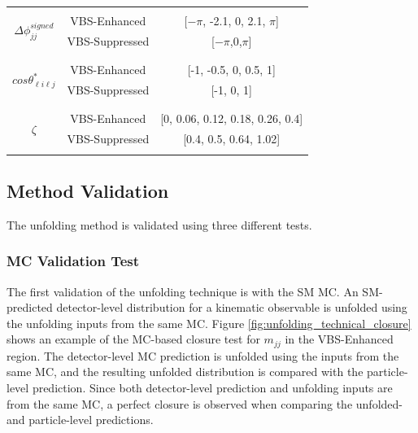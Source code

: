 \begin{table}[!htbp]
\begin{center}
\begin{tabular}{ | c | c | c | }
    & &\\
    \hline
    \multirow{4}{*}{ $\Delta \phi_{jj}^{signed}$ } &  &  \\
    & VBS-Enhanced & [$-\pi$, -2.1, 0, 2.1, $\pi$] \\
    & VBS-Suppressed & [$-\pi$,0,$\pi$] \\
    & & \\
    \hline
    \multirow{4}{*}{ $cos \theta_{\ell i\ell j}^{\ast}$ } &  &  \\
    & VBS-Enhanced & [-1, -0.5, 0, 0.5, 1] \\
    & VBS-Suppressed & [-1, 0, 1]\\
    & & \\
    \hline
    \multirow{4}{*}{ $\zeta$ } &  &  \\
    & VBS-Enhanced &[0, 0.06, 0.12, 0.18, 0.26, 0.4] \\
    & VBS-Suppressed & [0.4, 0.5, 0.64, 1.02]\\
    & &\\
    \hline
    \end{tabular}
    \end{center}
\end{table}

\subsection{Method Validation}
\label{subsec:UnfoldingValidation}
The unfolding method is validated using three different tests.

\subsubsection{MC Validation Test}
\label{subsubsec:MCClosure}

The first validation of the unfolding technique is with the SM MC. An SM-predicted detector-level distribution for a kinematic observable is unfolded using the unfolding inputs from the same MC. Figure \ref{fig:unfolding_technical_closure} shows an example of the MC-based closure test for $m_{jj}$ in the VBS-Enhanced region. The detector-level MC prediction is unfolded using the inputs from the same MC, and the resulting unfolded distribution is compared with the particle-level prediction. Since both detector-level prediction and unfolding inputs are from the same MC, a perfect closure is observed when comparing the unfolded- and particle-level predictions.


